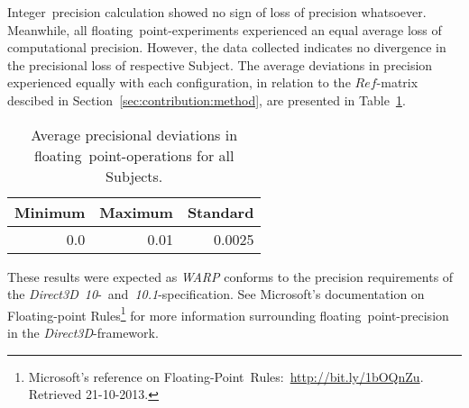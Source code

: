 \documentclass[fleqn,10pt]{SelfArx} %
\begin{document}
\noindent
Integer~precision calculation showed no sign of loss of precision whatsoever. Meanwhile, all floating~point-experiments experienced an equal average loss of computational precision. However, the data collected indicates no divergence in the precisional loss of respective Subject. The average deviations in precision experienced equally with each configuration, in relation to the $Ref$-matrix descibed in Section~\ref{sec:contribution:method}, are presented in Table~\ref{tab:contribution:results:avgprecision}.
\label{sec:contribution:results:computationalprecision}
\begin{table}[hbt]
\begin{center}
	\begin{tabular}{|r|r|r|}
		\hline
		\textbf{Minimum} 	& \textbf{Maximum} 	& \textbf{Standard} 	\\ \hline
		0.0     			& ~0.01   			& ~0.0025            		\\ \hline
	\end{tabular}
\caption {Average precisional deviations in floating~point-operations for all Subjects.}
\label{tab:contribution:results:avgprecision}
\end{center}
\end{table}

\noindent
These results were expected as \textit{WARP} conforms to the precision requirements of the \textit{Direct3D~10}-~and~\textit{10.1}-specification. See Microsoft's documentation on Floating-point Rules\footnote{Microsoft's reference on Floating-Point~Rules:~\url{http://bit.ly/1bOQnZu}. Retrieved 21-10-2013.} for more information surrounding floating~point-precision in the \textit{Direct3D}-framework.


\end{document}
